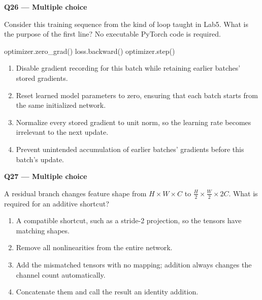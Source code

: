 \documentclass[11pt,a4paper]{article}
\begin{document}
\begin{minipage}{\linewidth}
\textbf{Q26 — Multiple choice}\par\smallskip
Consider this training sequence from the kind of loop taught in Lab5. What is the purpose of the first line? No executable PyTorch code is required.


\begin{Code}
optimizer.zero_grad()
loss.backward()
optimizer.step()
\end{Code}

\begin{enumerate}[label=\textbf{\Alph*.}]
\item Disable gradient recording for this batch while retaining earlier batches' stored gradients.
\item Reset learned model parameters to zero,\allowbreak{} ensuring that each batch starts from the same initialized network.
\item Normalize every stored gradient to unit norm,\allowbreak{} so the learning rate becomes irrelevant to the next update.
\item Prevent unintended accumulation of earlier batches' gradients before this batch's update.
\end{enumerate}
\end{minipage}
\par\vspace{12pt}
\begin{minipage}{\linewidth}
\textbf{Q27 — Multiple choice}\par\smallskip
A residual branch changes feature shape from \(H\times W\times C\) to \(\frac{H}{2}\times\frac{W}{2}\times2C\). What is required for an additive shortcut?
\begin{enumerate}[label=\textbf{\Alph*.}]
\item A compatible shortcut,\allowbreak{} such as a stride-2 projection,\allowbreak{} so the tensors have matching shapes.
\item Remove all nonlinearities from the entire network.
\item Add the mismatched tensors with no mapping; addition always changes the channel count automatically.
\item Concatenate them and call the result an identity addition.
\end{enumerate}
\end{minipage}
\par\vspace{12pt}
\end{document}
